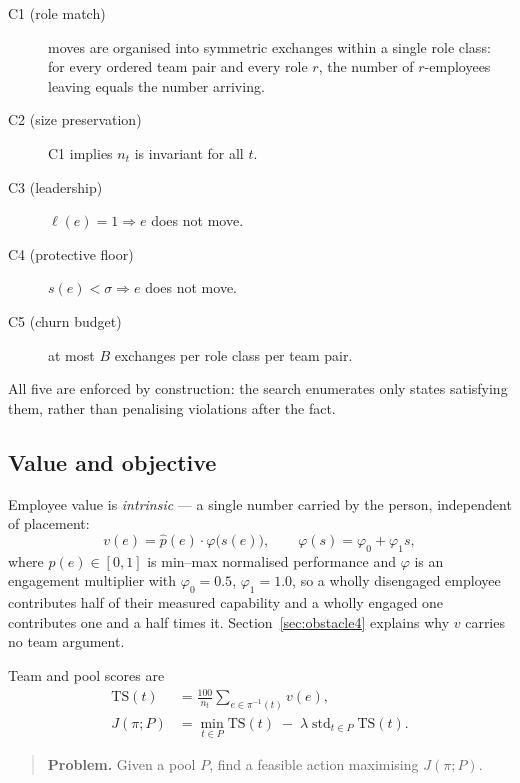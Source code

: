 \documentclass[conference]{IEEEtran}
\newcommand{\vv}{v}
\begin{document}
\begin{description}
\item[C1 (role match)] moves are organised into symmetric exchanges within a
single role class: for every ordered team pair and every role $r$, the number of
$r$-employees leaving equals the number arriving.
\item[C2 (size preservation)] C1 implies $n_t$ is invariant for all $t$.
\item[C3 (leadership)] $\ell(e)=1 \Rightarrow e$ does not move.
\item[C4 (protective floor)] $s(e) < \sigma \Rightarrow e$ does not move.
\item[C5 (churn budget)] at most $B$ exchanges per role class per team pair.
\end{description}

All five are enforced by construction: the search enumerates only states
satisfying them, rather than penalising violations after the fact.

\subsection{Value and objective}
Employee value is \emph{intrinsic} --- a single number carried by the person,
independent of placement:
\begin{equation}
\vv(e) = \widehat{p}(e)\cdot\varphi\big(s(e)\big), \qquad
\varphi(s) = \varphi_0 + \varphi_1 s,
\label{eq:value}
\end{equation}
where $\widehat{p}(e)\in[0,1]$ is min--max normalised performance and $\varphi$ is
an engagement multiplier with $\varphi_0=0.5$, $\varphi_1=1.0$, so a wholly
disengaged employee contributes half of their measured capability and a wholly
engaged one contributes one and a half times it. Section~\ref{sec:obstacle4}
explains why $\vv$ carries no team argument.

Team and pool scores are
\begin{align}
\mathrm{TS}(t) &= \frac{100}{n_t}\sum_{e\in\pi^{-1}(t)} \vv(e),
\label{eq:teamscore}\\[2pt]
J(\pi;P) &= \min_{t\in P}\mathrm{TS}(t)\;-\;\lambda\operatorname{std}_{t\in P}\mathrm{TS}(t).
\label{eq:objective}
\end{align}

\begin{quote}
\textbf{Problem.} Given a pool $P$, find a feasible action maximising
$J(\pi;P)$.
\end{quote}
\end{document}
